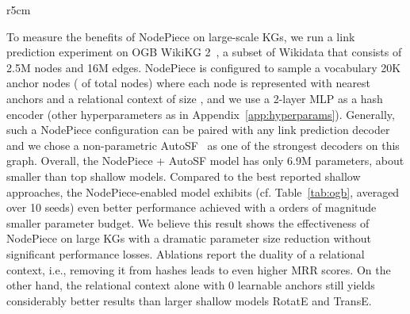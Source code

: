 \documentclass{article} \usepackage{iclr2022_conference,times}
\begin{document}
\begin{wraptable}{r}{5cm}
\centering
\caption{Test MRR and parameter budget on OGB WikiKG 2.}
\label{tab:ogb}
\end{wraptable}

To measure the benefits of NodePiece on large-scale KGs, we run a link prediction experiment on OGB WikiKG 2~\citep{DBLP:conf/nips/HuFZDRLCL20}, a subset of Wikidata that consists of 2.5M nodes and 16M edges. 
NodePiece is configured to sample a vocabulary 20K anchor nodes ( of total nodes) where each node is represented with  nearest anchors and a relational context of size , and we use a 2-layer MLP as a hash encoder (other hyperparameters as in Appendix~\ref{app:hyperparams}). 
Generally, such a NodePiece configuration can be paired with any link prediction decoder and we chose a non-parametric AutoSF~\citep{DBLP:conf/icde/ZhangYDC20} as one of the strongest  decoders on this graph. 
Overall, the NodePiece + AutoSF model has only 6.9M parameters, about  smaller than top shallow models.
Compared to the best reported shallow approaches, the NodePiece-enabled model exhibits (cf. Table~\ref{tab:ogb}, averaged over 10 seeds) even better performance achieved with a orders of magnitude smaller parameter budget.
We believe this result shows the effectiveness of NodePiece on large KGs with a dramatic parameter size reduction without significant performance losses. 
Ablations report the duality of a relational context, i.e., removing it from hashes leads to even higher MRR scores. On the other hand, the relational context alone with 0 learnable anchors still yields considerably better results than  larger shallow models RotatE and TransE. 
\end{document}
